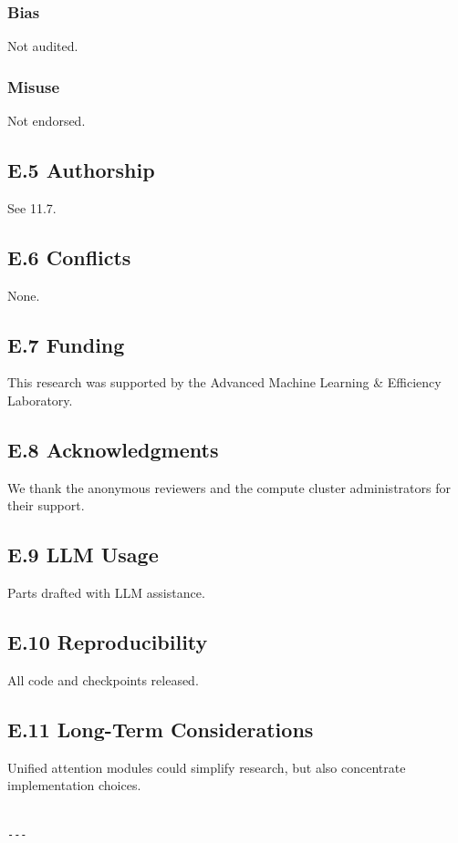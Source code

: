 \subsubsection{Bias}
Not audited.

\subsubsection{Misuse}
Not endorsed.

\subsection{E.5 Authorship}
See  11.7.

\subsection{E.6 Conflicts}
None.

\subsection{E.7 Funding}
This research was supported by the Advanced Machine Learning \& Efficiency Laboratory.

\subsection{E.8 Acknowledgments}
We thank the anonymous reviewers and the compute cluster administrators for their support.

\subsection{E.9 LLM Usage}
Parts drafted with LLM assistance.

\subsection{E.10 Reproducibility}
All code and checkpoints released.

\subsection{E.11 Long-Term Considerations}
Unified attention modules could simplify research, but also concentrate 
implementation choices.
\begin{lstlisting}

---
\end{lstlisting}